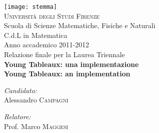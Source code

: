\begin{titlepage}
\begin{center}

\texttt{[image: stemma]}~\\[1cm]

\textsc{\LARGE Universit\`a degli Studi Firenze}\\[1.5cm]

\LARGE Scuola di Scienze Matematiche, Fisiche e Naturali\\
\LARGE C.d.L in Matematica\\[0.5cm]

\Large Anno accademico 2011-2012\\
\Large Relazione finale per la Laurea Triennale\\[1.5cm]

{ \huge \bfseries Young Tableaux: una implementazione}\\[1.0cm]
{ \LARGE \bfseries Young Tableaux: an implementation}\\[0.4cm]


\vspace{4cm}


\begin{minipage}{0.4\textwidth}
\begin{flushleft} \large
\emph{Candidato:}\\
Alessandro \textsc{Campagni}
\end{flushleft}
\end{minipage}
\begin{minipage}{0.4\textwidth}
\begin{flushright} \large
\emph{Relatore:} \\
Prof. Marco \textsc{Maggesi}
\end{flushright}
\end{minipage}

\end{center}
\end{titlepage}
